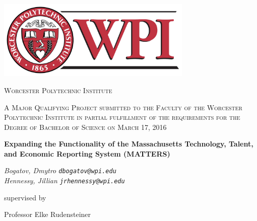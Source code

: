\begin{titlepage}
	\centering
	
	
    \includegraphics[width=0.7\textwidth]{images/wpiLogo.png}\par\vspace{0.0cm}
	
    {\scshape\Large Worcester Polytechnic Institute \par}
	\vspace{0.25cm}
	
    {\scshape\large
		A Major Qualifying Project submitted to the Faculty of the 
		Worcester Polytechnic Institute in partial fulfillment of 
		the requirements for the Degree of Bachelor of Science on March 17, 2016 
	\par}
	\vspace{0.25cm}
	
    {\LARGE\bfseries Expanding the Functionality of the Massachusetts Technology, Talent, and Economic Reporting System (MATTERS) \par}
	\vspace{0.5cm}
	
    {\large\itshape 
        Bogatov, Dmytro \texttt{dbogatov@wpi.edu} \\
        Hennessy, Jillian \texttt{jrhennessy@wpi.edu}
     \par}
	\vfill
	
    supervised by\par
	Professor Elke Rudensteiner

	\vfill
    
\end{titlepage}